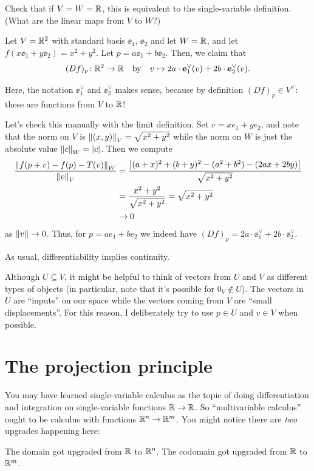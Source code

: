 \begin{ques}
	Check that if $V = W = \mathbb R$, this is equivalent to the single-variable definition.
	(What are the linear maps from $V$ to $W$?)
\end{ques}
\begin{example}[Total derivative of $f(x,y) = x^2+y^2$]
	Let $V = \mathbb R^2$ with standard basis $\ee_1$, $\ee_2$ and let $W = \mathbb R$,
	and let $f\left( x \ee_1 + y \ee_2 \right) = x^2+y^2$.  Let $p = a\ee_1 + b\ee_2$.
	Then, we claim that \[ (Df)_p \colon \mathbb R^2 \to \mathbb R \quad\text{by}\quad
	v \mapsto 2a \cdot \mathbf e_1^\vee(v) + 2b \cdot \mathbf e_2^\vee(v). \]
\end{example}
Here, the notation $\ee_1^\vee$ and $\ee_2^\vee$ makes sense,
because by definition $(Df)_p \in V^\vee$: these are functions from $V$ to $\mathbb R$!

Let's check this manually with the limit definition.
Set $v = xe_1 + ye_2$, and note that the norm on $V$ is $\left\lVert (x,y) \right\rVert_V = \sqrt{x^2+y^2}$
while the norm on $W$ is just the absolute value $\left\lVert c \right\rVert_W = \left\lvert c \right\rvert$.
Then we compute
\begin{align*}
	\frac{\left\lVert f(p + v) - f(p) - T(v) \right\rVert_W}{\left\lVert v \right\rVert_V}
	&= \frac{\left\lvert (a+x)^2 + (b+y)^2 - (a^2+b^2) - (2ax+2by) \right\rvert}{\sqrt{x^2+y^2}} \\
	&= \frac{x^2+y^2}{\sqrt{x^2+y^2}} = \sqrt{x^2+y^2} \\
	&\to 0
\end{align*}
as $\left\lVert v \right\rVert \to 0$.
Thus, for $p = ae_1 + be_2$ we indeed have $(Df)_p = 2a \cdot \ee_1^\vee + 2b \cdot \ee_2^\vee$.

\begin{remark}
	As usual, differentiability implies continuity.
\end{remark}
\begin{remark}
	Although $U \subseteq V$, it might be helpful to think of vectors from $U$ and $V$
	as different types of objects (in particular, note that it's possible for $0_V \notin U$).
	The vectors in $U$ are ``inputs'' on our space
	while the vectors coming from $V$ are ``small displacements''.
	For this reason, I deliberately try to use $p \in U$ and $v \in V$ when possible.
\end{remark}

\section{The projection principle}
You may have learned single-variable calculus as the topic of doing
differentiation and integration on single-variable functions $\mathbb R \to \mathbb R$.
So ``multivariable calculus'' ought to be calculus with functions $\mathbb R^n \to \mathbb R^m$.
You might notice there are \emph{two} upgrades happening here:
\begin{itemize}
	\ii The domain got upgraded from $\mathbb R$ to $\mathbb R^n$.
	\ii The codomain got upgraded from $\mathbb R$ to $\mathbb R^m$.
\end{itemize}

